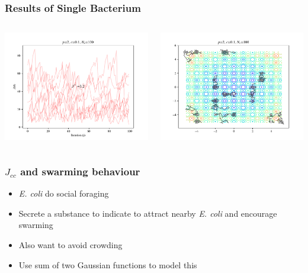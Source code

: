 \documentclass{beamer}
\begin{document}
\begin{frame}
\frametitle{Results of Single Bacterium}
\begin{columns}[T]
    \begin{center}
      \includegraphics[scale=0.35]{assets/rastrigin_J}
    \end{center}
  \begin{center}
    \includegraphics[scale=0.35]{assets/rastrigin_theta}
  \end{center}
\end{columns}
\end{frame}

\begin{frame}
\frametitle{$J_{cc}$ and swarming behaviour}
\begin{itemize}
  \item \textit{\textit{E. coli}} do social foraging
  \item Secrete a substance to indicate to attract nearby \textit{\textit{E. coli}} and encourage swarming
  \item Also want to avoid crowding
  \item Use sum of two Gaussian functions to model this
\end{itemize}
\end{frame}
\end{document}
